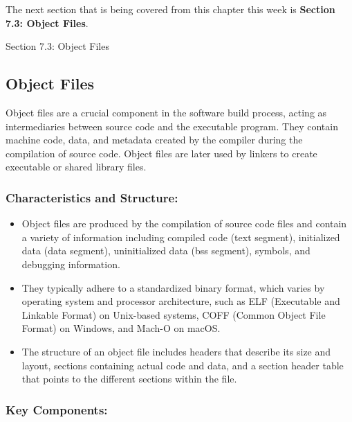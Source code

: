 The next section that is being covered from this chapter this week is \textbf{Section 7.3: Object Files}.

\begin{notes}{Section 7.3: Object Files}
    \subsection*{Object Files}

    Object files are a crucial component in the software build process, acting as intermediaries between source code and the executable program. They contain machine code, data, and metadata created by the compiler during the compilation of source code. Object files are later used by linkers to create executable or shared library files. \vspace*{1em}
    
    \subsubsection*{Characteristics and Structure:}
    
    \begin{itemize}
        \item Object files are produced by the compilation of source code files and contain a variety of information including compiled code (text segment), initialized data (data segment), uninitialized data (bss segment), symbols, and debugging information.
        \item They typically adhere to a standardized binary format, which varies by operating system and processor architecture, such as ELF (Executable and Linkable Format) on Unix-based systems, COFF (Common Object File Format) on Windows, and Mach-O on macOS.
        \item The structure of an object file includes headers that describe its size and layout, sections containing actual code and data, and a section header table that points to the different sections within the file.
    \end{itemize}
    
    \subsubsection*{Key Components:}
    

\end{notes}
